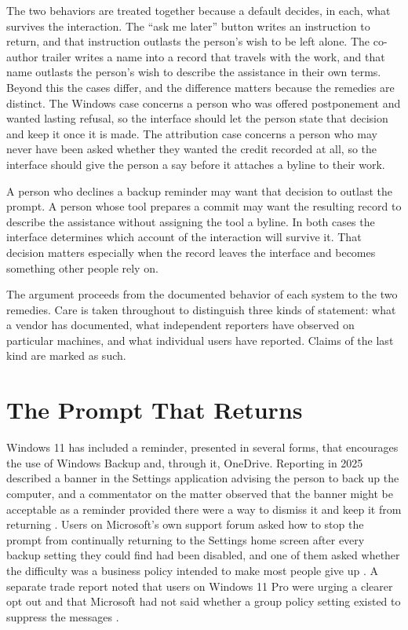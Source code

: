 \documentclass[11pt]{article}
\begin{document}
The two behaviors are treated together because a default decides, in each, what survives the interaction. The ``ask me later'' button writes an instruction to return, and that instruction outlasts the person's wish to be left alone. The co-author trailer writes a name into a record that travels with the work, and that name outlasts the person's wish to describe the assistance in their own terms. Beyond this the cases differ, and the difference matters because the remedies are distinct. The Windows case concerns a person who was offered postponement and wanted lasting refusal, so the interface should let the person state that decision and keep it once it is made. The attribution case concerns a person who may never have been asked whether they wanted the credit recorded at all, so the interface should give the person a say before it attaches a byline to their work.

A person who declines a backup reminder may want that decision to outlast the prompt. A person whose tool prepares a commit may want the resulting record to describe the assistance without assigning the tool a byline. In both cases the interface determines which account of the interaction will survive it. That decision matters especially when the record leaves the interface and becomes something other people rely on.

The argument proceeds from the documented behavior of each system to the two remedies. Care is taken throughout to distinguish three kinds of statement: what a vendor has documented, what independent reporters have observed on particular machines, and what individual users have reported. Claims of the last kind are marked as such.

\section{The Prompt That Returns}

Windows 11 has included a reminder, presented in several forms, that encourages the use of Windows Backup and, through it, OneDrive. Reporting in 2025 described a banner in the Settings application advising the person to back up the computer, and a commentator on the matter observed that the banner might be acceptable as a reminder provided there were a way to dismiss it and keep it from returning \cite{posey2025}. Users on Microsoft's own support forum asked how to stop the prompt from continually returning to the Settings home screen after every backup setting they could find had been disabled, and one of them asked whether the difficulty was a business policy intended to make most people give up \cite{techcommunity2025}. A separate trade report noted that users on Windows 11 Pro were urging a clearer opt out and that Microsoft had not said whether a group policy setting existed to suppress the messages \cite{windowsreport2025}.
\end{document}
